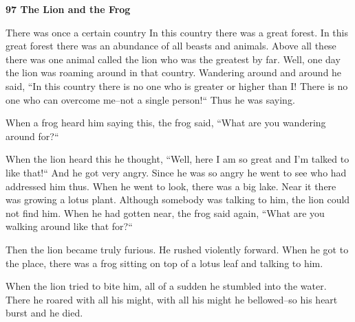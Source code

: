 
\textbf{97 The Lion and the Frog}

There was once a certain country In this country there was a great forest. In this
great forest there was an abundance of all beasts and animals. Above all these
there was one animal called the lion who was the greatest by far. Well, one day
the lion was roaming around in that country. Wandering around and around he said,
``In this country there is no one who is greater or higher than I! There
is no one who can overcome me--not a single person!`` Thus he was saying.

When a frog heard him saying this, the frog said, ``What are you wandering
around for?``

When the lion heard this he thought, ``Well, here I am so great and I'm
talked to like that!`` And he got very angry. Since he was so angry he
went to see who had addressed him thus. When he went to look, there was a big lake.
Near it there was growing a lotus plant. Although somebody was talking to him,
the lion could not find him. When he had gotten near, the frog said again, ``What
are you walking around like that for?``

Then the lion became truly furious. He rushed violently forward. When he got to
the place, there was a frog sitting on top of a lotus leaf and talking to him.

When the lion tried to bite him, all of a sudden he stumbled into the water. There
he roared with all his might, with all his might he bellowed--so his heart burst
and he died.



